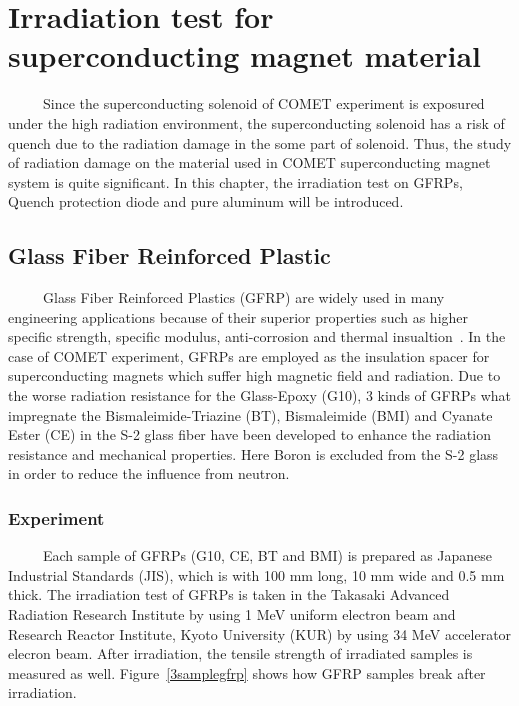 \chapter{Irradiation test for superconducting magnet material}
~~~~~Since the superconducting solenoid of COMET experiment is exposured under the high radiation environment, the superconducting solenoid has a risk of quench due to the radiation damage in the some part of solenoid.
Thus, the study of radiation damage on the material used in COMET superconducting magnet system is quite significant.
In this chapter, the irradiation test on GFRPs, Quench protection diode and pure aluminum will be introduced.

 \section{Glass Fiber Reinforced Plastic}
~~~~~Glass Fiber Reinforced Plastics (GFRP) are widely used in many engineering applications because of their superior properties such as higher specific strength, specific modulus, anti-corrosion and thermal insualtion~\cite{gfrp}.
In the case of COMET experiment, GFRPs are employed as the insulation spacer for superconducting magnets which suffer high magnetic field and radiation.
Due to the worse radiation resistance for the Glass-Epoxy (G10), 3 kinds of GFRPs what impregnate the Bismaleimide-Triazine (BT), Bismaleimide (BMI) and Cyanate Ester (CE) in the S-2 glass fiber have been developed to enhance the radiation resistance and mechanical properties.
Here Boron is excluded from the S-2 glass in order to reduce the influence from neutron.

 \subsection{Experiment}
~~~~~Each sample of GFRPs (G10, CE, BT and BMI) is prepared as Japanese Industrial Standards (JIS), which is with 100 mm long, 10 mm wide and 0.5 mm thick.
The irradiation test of GFRPs is taken in the Takasaki Advanced Radiation Research Institute by using 1 MeV uniform electron beam and Research Reactor Institute, Kyoto University (KUR) by using 34 MeV accelerator elecron beam.
After irradiation, the tensile strength of irradiated samples is measured as well.
Figure~\ref{3samplegfrp} shows how GFRP samples break after irradiation.

